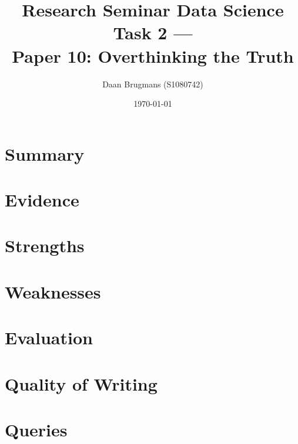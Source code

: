 \documentclass{IEEEtran}
\begin{document}
\title{Research Seminar Data Science Task 2 ---\\Paper 10: Overthinking the Truth}
\author{Daan Brugmans (S1080742)}
\date{\today}

\maketitle

\section{Summary}

\section{Evidence}

\section{Strengths}

\section{Weaknesses}

\section{Evaluation}

\section{Quality of Writing}

\section{Queries}
\end{document}
